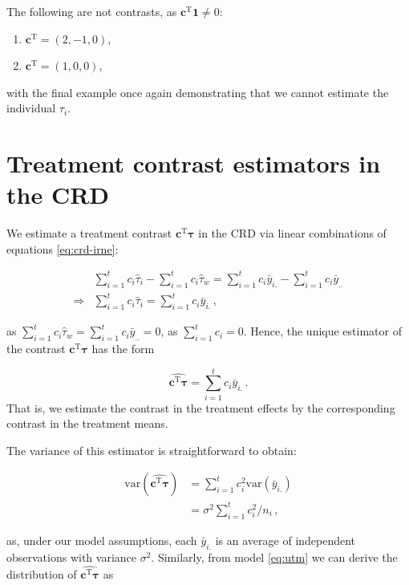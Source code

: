 \documentclass[
]{book}
\providecommand{\tightlist}{%
  \setlength{\itemsep}{0pt}\setlength{\parskip}{0pt}}
\theoremstyle{definition}
\theoremstyle{definition}
\theoremstyle{definition}
\theoremstyle{definition}
\theoremstyle{remark}
\begin{document}
The following are not contrasts, as \(\boldsymbol{c}^{\mathrm{T}}\boldsymbol{1} \ne 0\):

\begin{enumerate}
\def\labelenumi{\arabic{enumi}.}
\setcounter{enumi}{5}
\tightlist
\item
  \(\boldsymbol{c}^{\mathrm{T}} = (2, -1, 0)\),
\item
  \(\boldsymbol{c}^{\mathrm{T}} = (1, 0, 0)\),
\end{enumerate}

with the final example once again demonstrating that we cannot estimate the individual \(\tau_i\).

\hypertarget{contrast-crd}{%
\section{Treatment contrast estimators in the CRD}\label{contrast-crd}}

We estimate a treatment contrast \(\boldsymbol{c}^{\mathrm{T}}\boldsymbol{\tau}\) in the CRD via linear combinations of equations \eqref{eq:crd-irne}:

\begin{align*}
& \sum_{i=1}^t c_i\hat{\tau}_i - \sum_{i=1}^tc_i\hat{\tau}_w = \sum_{i=1}^tc_i\bar{y}_{i.} - \sum_{i=1}^tc_i\bar{y}_{..} \\
\Rightarrow & \sum_{i=1}^t c_i\hat{\tau}_i = \sum_{i=1}^tc_i\bar{y}_{i.}\,,
\end{align*}

as \(\sum_{i=1}^tc_i\hat{\tau}_w = \sum_{i=1}^tc_i\bar{y}_{..} = 0\), as \(\sum_{i=1}^tc_i = 0\). Hence, the unique estimator of the contrast \(\boldsymbol{c}^{\mathrm{T}}\boldsymbol{\tau}\) has the form

\[
\widehat{\boldsymbol{c}^{\mathrm{T}}\boldsymbol{\tau}} = \sum_{i=1}^tc_i\bar{y}_{i.}\,.
\]
That is, we estimate the contrast in the treatment effects by the corresponding contrast in the treatment means.

The variance of this estimator is straightforward to obtain:

\begin{align*}
\mathrm{var}\left(\widehat{\boldsymbol{c}^{\mathrm{T}}\boldsymbol{\tau}}\right) 
& = \sum_{i=1}^tc_i^2\mathrm{var}(\bar{y}_{i.}) \\
& = \sigma^2\sum_{i=1}^tc_i^2/n_i\,,
\end{align*}

as, under our model assumptions, each \(\bar{y}_{i.}\) is an average of independent observations with variance \(\sigma^2\). Similarly, from model \eqref{eq:utm} we can derive the distribution of \(\widehat{\boldsymbol{c}^{\mathrm{T}}\boldsymbol{\tau}}\) as
\end{document}
